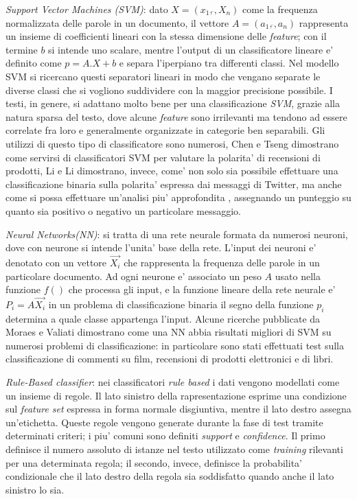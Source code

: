 \documentclass[a4paper,12pt,openright,twoside]{report}
\theoremstyle{definition}
\begin{document}
\emph{Support Vector Machines (SVM)}: dato $X=(x_1,\ddot{}, X_n)$ come la frequenza normalizzata delle parole
in un documento, il vettore $A=(a_1,\ddot{},a_n)$ rappresenta un insieme di coefficienti lineari con la
stessa dimensione delle \emph{feature}; con il termine $b$ si intende uno scalare, 
mentre l'output di un classificatore
lineare e' definito come $p=A.X + b$ e separa l'iperpiano tra differenti classi.
Nel modello SVM si ricercano questi separatori lineari in modo che vengano separate le diverse classi che si
vogliono suddividere con la maggior precisione possibile.
I testi, in genere, si adattano molto bene per una classificazione \emph{SVM}, grazie alla natura sparsa del testo, dove
alcune \emph{feature} sono irrilevanti ma tendono ad essere correlate fra loro e generalmente organizzate
in categorie ben separabili.
Gli utilizzi di questo tipo di classificatore sono numerosi, Chen e Tseng %
dimostrano come servirsi di classificatori SVM per valutare la polarita' di recensioni di prodotti,
Li e Li %
dimostrano, invece, come' non solo sia possibile effettuare una classificazione binaria sulla polarita' espressa
dai messaggi di Twitter, ma anche come si possa effettuare un'analisi piu' approfondita
, assegnando un punteggio
su quanto sia positivo o negativo un particolare messaggio.

\emph{Neural Networks(NN)}: si tratta di una rete neurale formata da numerosi neuroni, dove con neurone si intende l'unita'
base della rete. L'input dei neuroni e' denotato con un vettore $\vec{X_i}$ che rappresenta la frequenza
delle parole in un particolare documento. Ad ogni neurone e' associato un peso $A$ usato nella funzione $f()$
che processa gli input, e la funzione lineare della rete neurale e' $P_i = A\dot{} \vec{X_i}$ in un problema
di classificazione binaria il segno della funzione $p_i$ determina a quale classe appartenga l'input.
Alcune ricerche pubblicate da Moraes e Valiati %
dimostrano come una NN abbia risultati migliori di SVM su numerosi problemi di classificazione: in particolare
sono stati effettuati test sulla classificazione di commenti su film, recensioni di prodotti elettronici e di libri.

\emph{Rule-Based classifier}: nei classificatori \emph{rule based} i dati vengono modellati come un insieme di regole.
Il lato sinistro della rapresentazione esprime una condizione sul \emph{feature set} espressa in forma normale
disgiuntiva, mentre il lato destro assegna un'etichetta.
Queste regole vengono generate durante la fase di test tramite determinati criteri; i piu' comuni sono
definiti \emph{support} e \emph{confidence}. Il primo definisce il numero assoluto di 
istanze nel testo utilizzato
come \emph{training} rilevanti per una determinata regola; il secondo, invece, definisce la probabilita'
condizionale che il lato destro della regola sia soddisfatto quando anche il lato sinistro lo sia.
\end{document}
